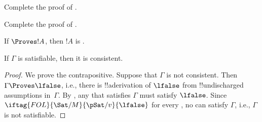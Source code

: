 \documentclass[../../../include/open-logic-section]{subfiles}
\begin{document}
\begin{prob}
Complete the proof of .
\end{prob}
\tagendprob

\begin{prob}
Complete the proof of .
\end{prob}
\tagendprob

\begin{cor}
If $\Proves !A$, then $!A$ is .
\end{cor}

\begin{cor}
If $\Gamma$ is satisfiable, then it is consistent.
\end{cor}

\begin{proof}
We prove the contrapositive.  Suppose that $\Gamma$ is not consistent.
Then $\Gamma \Proves \lfalse$, i.e., there is !!a{derivation} of
$\lfalse$ from !!{undischarged} assumptions in~$\Gamma$. By
, any
that satisfies $\Gamma$ must satisfy $\lfalse$.  Since
$\iftag{FOL}{\Sat/{M}}{\pSat/{v}}{\lfalse}$ for every
,
no  can satisfy $\Gamma$,
i.e., $\Gamma$ is not satisfiable.
\end{proof}
\end{document}
